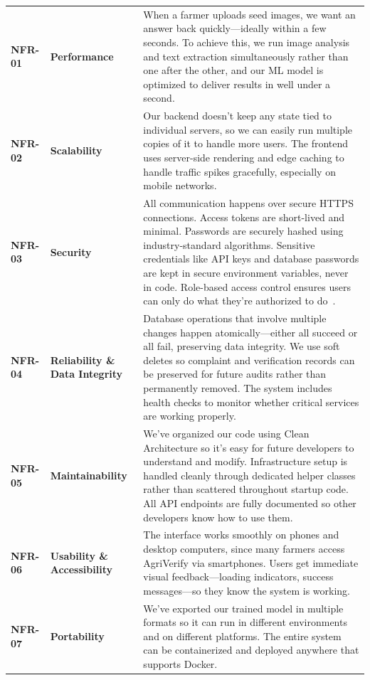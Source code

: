 \begin{longtable}{@{} p{2.0cm} p{3.2cm} >{\raggedright\arraybackslash}p{8.2cm} @{}}
\textbf{NFR-01} & \textbf{Performance} & When a farmer uploads seed images, we want an answer back quickly—ideally within a few seconds. To achieve this, we run image analysis and text extraction simultaneously rather than one after the other, and our ML model is optimized to deliver results in well under a second. \\
\addlinespace
\textbf{NFR-02} & \textbf{Scalability} & Our backend doesn't keep any state tied to individual servers, so we can easily run multiple copies of it to handle more users. The frontend uses server-side rendering and edge caching to handle traffic spikes gracefully, especially on mobile networks. \\
\addlinespace
\textbf{NFR-03} & \textbf{Security} & All communication happens over secure HTTPS connections. Access tokens are short-lived and minimal. Passwords are securely hashed using industry-standard algorithms. Sensitive credentials like API keys and database passwords are kept in secure environment variables, never in code. Role-based access control ensures users can only do what they're authorized to do~\cite{owasp2021top10}. \\
\addlinespace
\textbf{NFR-04} & \textbf{Reliability \& Data Integrity} & Database operations that involve multiple changes happen atomically—either all succeed or all fail, preserving data integrity. We use soft deletes so complaint and verification records can be preserved for future audits rather than permanently removed. The system includes health checks to monitor whether critical services are working properly. \\
\addlinespace
\textbf{NFR-05} & \textbf{Maintainability} & We've organized our code using Clean Architecture so it's easy for future developers to understand and modify. Infrastructure setup is handled cleanly through dedicated helper classes rather than scattered throughout startup code. All API endpoints are fully documented so other developers know how to use them. \\
\addlinespace
\textbf{NFR-06} & \textbf{Usability \& Accessibility} & The interface works smoothly on phones and desktop computers, since many farmers access AgriVerify via smartphones. Users get immediate visual feedback—loading indicators, success messages—so they know the system is working. \\
\addlinespace
\textbf{NFR-07} & \textbf{Portability} & We've exported our trained model in multiple formats so it can run in different environments and on different platforms. The entire system can be containerized and deployed anywhere that supports Docker. \\
\end{longtable}


